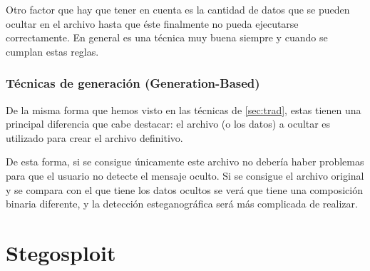 Otro factor que hay que tener en cuenta es la cantidad de datos que se pueden ocultar en el archivo hasta que éste finalmente no pueda ejecutarse correctamente. En general es una técnica muy buena siempre y cuando se cumplan estas reglas.

\subsubsection{Técnicas de generación (Generation-Based)}

De la misma forma que hemos visto en las técnicas de \ref{sec:trad}, estas tienen una principal diferencia que cabe destacar: el archivo (o los datos) a ocultar es utilizado para crear el archivo definitivo.

De esta forma, si se consigue únicamente este archivo no debería haber problemas para que el usuario no detecte el mensaje oculto. Si se consigue el archivo original y se compara con el que tiene los datos ocultos se verá que tiene una composición binaria diferente, y la detección esteganográfica será más complicada de realizar.

\section{Stegosploit}

